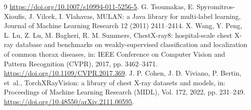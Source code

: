 \documentclass[11pt, letterpaper]{article}
\begin{document}
\begin{thebibliography}{9}
  \url{https://doi.org/10.1007/s10994-011-5256-5}.
 G. Tsoumakas, E. Spyromitros-Xioufis, J. Vilcek,
  I. Vlahavas, MULAN: a Java library for multi-label learning, Journal of Machine Learning
  Research 12 (2011) 2411--2414.
 X. Wang, Y. Peng, L. Lu, Z. Lu, M. Bagheri,
  R. M. Summers, ChestX-ray8: hospital-scale chest X-ray database and benchmarks on
  weakly-supervised classification and localization of common thorax diseases, in:
  IEEE Conference on Computer Vision and Pattern Recognition (CVPR), 2017, pp. 3462--3471.
  \url{https://doi.org/10.1109/CVPR.2017.369}.
 J. P. Cohen, J. D. Viviano, P. Bertin, et~al.,
  TorchXRayVision: a library of chest X-ray datasets and models, in: Proceedings of
  Machine Learning Research (MIDL), Vol. 172, 2022, pp. 231--249.
  \url{https://doi.org/10.48550/arXiv.2111.00595}.
\end{thebibliography}
\end{document}

